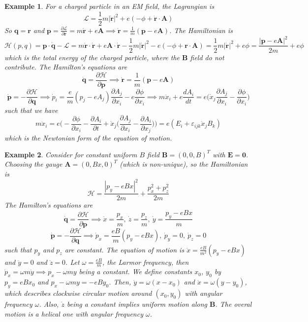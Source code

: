 \documentclass[a4paper]{article}
\newtheorem{eg}{Example}[section]
\theoremstyle{new}
\begin{document}
\begin{eg}
For a charged particle in an EM field, the Lagrangian is
$$\mathcal{L}=\frac{1}{2}m|\mathbf{\dot{r}}|^2+e(-\phi+\mathbf{\dot{r}}\cdot\mathbf{A})$$
So $\mathbf{q}=\mathbf{r}$ and $\mathbf{p}=\frac{\partial\mathcal{L}}{\partial\mathbf{\dot{r}}}=m\mathbf{\dot{r}}+e\mathbf{A}\implies\mathbf{\dot{r}}=\frac{1}{m}(\mathbf{p}-e\mathbf{A})$. The Hamiltonian is
$$\mathcal{H}(p,q)=\mathbf{p}\cdot\mathbf{\dot{q}}-\mathcal{L}=m\mathbf{\dot{r}}\cdot\mathbf{\dot{r}}+e\mathbf{A}\cdot\mathbf{\dot{r}}-\frac{1}{2}m|\mathbf{\dot{r}}|^2-e(-\phi+\mathbf{r}\cdot\mathbf{A})=\frac{1}{2}m|\mathbf{\dot{r}}|^2+e\phi=\frac{|\mathbf{p}-e\mathbf{A}|^2}{2m}+e\phi$$
which is the total energy of the charged particle, where the $\mathbf{B}$ field do not contribute. The Hamilton's equations are
$$\mathbf{\dot{q}}=\frac{\partial\mathcal{H}}{\partial\mathbf{p}}\implies\mathbf{\dot{r}}=\frac{1}{m}(\mathbf{p}-e\mathbf{A})$$
$$\mathbf{\dot{p}}=-\frac{\partial\mathcal{H}}{\partial\mathbf{q}}\implies\dot{p}_i=\frac{e}{m}(p_j-eA_j)\frac{\partial A_j}{\partial x_i}-e\frac{\partial\phi}{\partial x_i}\implies m\ddot{x}_i+e\frac{dA_i}{dt}=e\bigg(\dot{x}_j\frac{\partial A_j}{\partial x_i}-\frac{\partial\phi}{\partial x_i}\bigg)$$
such that we have
$$m\ddot{x}_i=e\bigg(-\frac{\partial\phi}{\partial x_i}-\frac{\partial A_i}{\partial t}+\dot{x}_j\bigg(\frac{\partial A_j}{\partial x_i}-\frac{\partial A_i}{\partial x_j}\bigg)\bigg)=e(E_i+\varepsilon_{ijk}\dot{x}_jB_k)$$
which is the Newtonian form of the equation of motion.
\end{eg}
\begin{eg}
Consider for constant uniform $B$ field $\mathbf{B}=(0,0,B)^T$ with $\mathbf{E}=\boldsymbol{0}$. Choosing the gauge $\mathbf{A}=(0,Bx,0)^T$ (which is non-unique), so the Hamiltonian is
$$\mathcal{H}=\frac{|p_y-eBx|^2}{2m}+\frac{p_x^2+p_z^2}{2m}$$
The Hamilton's equations are
$$\mathbf{\dot{q}}=\frac{\partial\mathcal{H}}{\partial\mathbf{p}}\implies\dot{x}=\frac{p_x}{m},~\dot{z}=\frac{p_z}{m},~\dot{y}=\frac{p_y-eBx}{m}$$
$$\mathbf{\dot{p}}=-\frac{\partial\mathcal{H}}{\partial\mathbf{q}}\implies\dot{p}_x=\frac{eB}{m}(p_y-eBx),~\dot{p}_y=0,~\dot{p}_z=0$$
such that $p_y$ and $p_z$ are constant. The equation of motion is $\ddot{x}=\frac{eB}{m^2}(p_y-eBx)$ and $\ddot{y}=0$ and $\ddot{z}=0$. Let $\omega=\frac{eB}{m}$, the Larmor frequency, then $\dot{p}_x=\omega m\dot{y}\implies p_x-\omega my$ being a constant. We define constants $x_0$, $y_0$ by $p_y=eBx_0$ and $p_x-\omega my=-eBy_0$. Then, $\dot{y}=\omega(x-x_0)$ and $\dot{x}=\omega(y-y_0)$, which describes clockwise circular motion around $(x_0,y_0)$ with angular frequency $\omega$. Also, $\dot{z}$ being a constant implies uniform motion along $\mathbf{B}$. The overal motion is a helical one with angular frequency $\omega$.
\end{eg}
\end{document}

